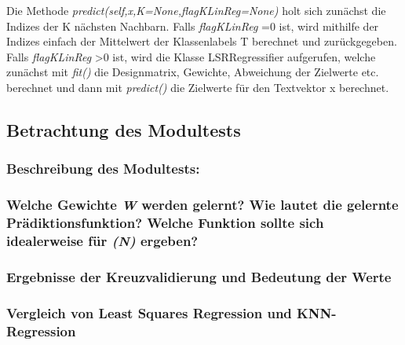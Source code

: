 \noindent
 \vspace{0px}
Die Methode \textit{predict(self,x,K=None,flagKLinReg=None)} holt sich zunächst die Indizes der K nächsten Nachbarn. 
Falls \textit{ flagKLinReg }=0 ist, wird mithilfe der Indizes einfach der Mittelwert der Klassenlabels T berechnet und zurückgegeben. 
Falls \textit{ flagKLinReg }>0 ist, wird die Klasse LSRRegressifier aufgerufen, welche zunächst mit \textit{ fit() } die Designmatrix, Gewichte, Abweichung der Zielwerte etc. berechnet und dann mit \textit{ predict() } die Zielwerte für den Textvektor x berechnet. 

\subsection{
    Betrachtung des Modultests
}

\subsubsection{ Beschreibung des Modultests: }

\subsubsection{ Welche Gewichte \textit{W} werden gelernt? Wie lautet die gelernte Prädiktionsfunktion? Welche Funktion sollte sich idealerweise für \textit{(N\rightarrow\infty)} ergeben? }

\subsubsection{ Ergebnisse der Kreuzvalidierung und Bedeutung der Werte }

\subsubsection{ Vergleich von Least Squares Regression und KNN-Regression }
